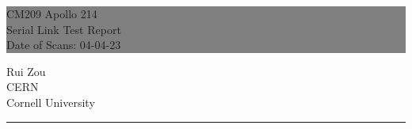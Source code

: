 \documentclass{report}
\newcommand\dateofscans{04-04-23} %
\begin{document}

\begin{titlepage} %
  
  
  \colorbox{grey}{
    \parbox[t]{0.93\textwidth}{ %
      \parbox[t]{0.91\textwidth}{ %
        \raggedleft %
        \fontsize{80pt}{40pt}\selectfont %
        \vspace{0.7cm} %

        CM209 Apollo 214\\
        Serial Link Test Report\\
        Date of Scans: \dateofscans\\
        
        \vspace{0.7cm} %
        }
      }
    }
  
  \vfill %
  
  
  \parbox[t]{0.93\textwidth}{ %
    \raggedleft %
    \large %
    {\Large Rui Zou}\\[4pt] %
    CERN\\
    Cornell University\\[4pt] %
    
    \hfill\rule{0.2\linewidth}{1pt}%
    }
  
\end{titlepage}

\hypertarget{MyToc}{}  %
\tableofcontents
\newpage
\end{document}
